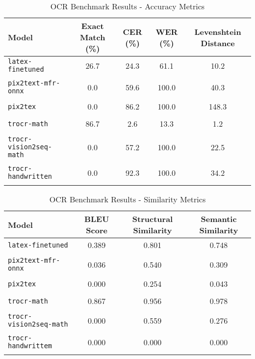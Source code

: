 
\begin{table}[htbp]
\centering
\caption{OCR Benchmark Results - Accuracy Metrics}
\label{tab:ocr_benchmark_accuracy}
\begin{tabular}{|l|c|c|c|c|}
\hline
\textbf{Model} & \textbf{Exact Match (\%)} & \textbf{CER (\%)} & \textbf{WER (\%)} & \textbf{Levenshtein Distance} \\
\hline
\texttt{latex-finetuned} & 26.7 & 24.3 & 61.1 & 10.2 \\\\
\hline
\texttt{pix2text-mfr-onnx} & 0.0 & 59.6 & 100.0 & 40.3 \\\\
\hline
\texttt{pix2tex} & 0.0 & 86.2 & 100.0 & 148.3 \\\\
\hline
\texttt{trocr-math} & 86.7 & 2.6 & 13.3 & 1.2 \\\\
\hline
\texttt{trocr-vision2seq-math} & 0.0 & 57.2 & 100.0 & 22.5 \\\\
\hline
\texttt{trocr-handwritten} & 0.0 & 92.3 & 100.0 & 34.2 \\\\
\hline
\end{tabular}
\end{table}


\begin{table}[htbp]
\centering
\caption{OCR Benchmark Results - Similarity Metrics}
\label{tab:ocr_benchmark_similarity}
\begin{tabular}{|l|c|c|c|}
\hline
\textbf{Model} & \textbf{BLEU Score} & \textbf{Structural Similarity} & \textbf{Semantic Similarity} \\
\hline
\texttt{latex-finetuned} & 0.389 & 0.801 & 0.748 \\\\
\hline
\texttt{pix2text-mfr-onnx} & 0.036 & 0.540 & 0.309 \\\\
\hline
\texttt{pix2tex} & 0.000 & 0.254 & 0.043 \\\\
\hline
\texttt{trocr-math} & 0.867 & 0.956 & 0.978 \\\\
\hline
\texttt{trocr-vision2seq-math} & 0.000 & 0.559 & 0.276 \\\\
\hline
\texttt{trocr-handwrittem} & 0.000 & 0.000 & 0.000 \\\\
\hline
\end{tabular}
\end{table}


